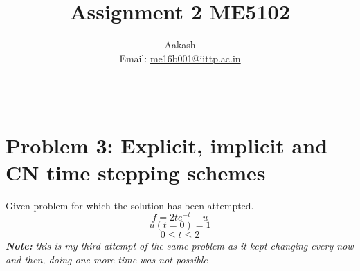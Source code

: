 \documentclass[11pt]{article}
\title{Assignment 2 ME5102}
\author{Aakash \\ Email: \href{mailto:me16b001@iittp.ac.in}{me16b001@iittp.ac.in}}
\begin{document}
    
    
    \maketitle
    
    

    
    \begin{center}\rule{0.5\linewidth}{\linethickness}\end{center}

\section*{Problem 3: Explicit, implicit and CN time stepping
schemes}\label{problem-3-explicit-implicit-and-cn-time-stepping-schemes}

Given problem for which the solution has been attempted.
\[ f=2te^{-t}-u\] \[ u(t=0)=1\] \[ 0\leq t \leq 2\]
\textbf{\emph{Note:}} \emph{this is my third attempt of the same problem
as it kept changing every now and then, doing one more time was not
possible}
\end{document}
